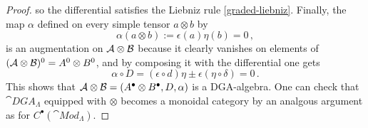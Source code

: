 \begin{prop}
\begin{proof}
			so the differential satisfies the Liebniz rule \eqref{graded-liebniz}.
			Finally, the map $\alpha$ defined on every simple tensor 
			$a \otimes b$ by
			\begin{equation*}
				\alpha( a \otimes b ) := \epsilon(a)\eta(b) = 0\,,
			\end{equation*}
			is an augmentation on $\mathcal{A} \otimes \mathcal{B}$ because
			it clearly vanishes on elements of $(\mathcal{A} \otimes \mathcal{B})^{0}
			= A^{0} \otimes B^{0}$, and
			by composing it with the differential one gets
			\begin{equation*}
				\alpha \circ D
				= (\epsilon \circ d) \eta
				\pm \epsilon (\eta \circ \delta)
				= 0\,.
			\end{equation*}
			This shows that $\mathcal{A} \otimes \mathcal{B} 
			= (A^{\bullet} \otimes B^{\bullet}, D, \alpha)$
			is a DGA-algebra.
			One can check that $\cat{DGA}_{\Lambda}$ equipped with $\otimes$
			becomes a monoidal category by
			an analgous argument as for $C^{\bullet}(\cat{Mod}_{\Lambda})$.
		\end{proof}
	\end{prop}
	

	
	
	
	
	
	
	